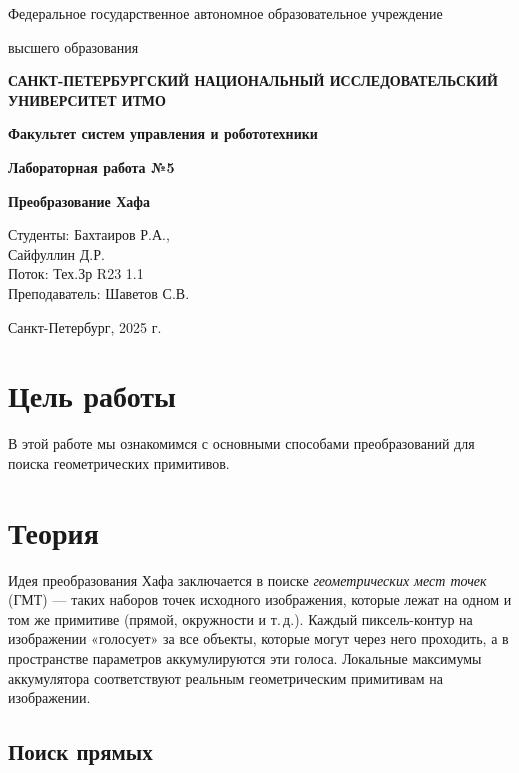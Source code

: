 \documentclass[a4paper,12pt]{article}
\begin{document}
    

\begin{titlepage}
    \centering
    {\large Федеральное государственное автономное образовательное учреждение\par}
    {\large высшего образования\par}
    {\bfseries САНКТ-ПЕТЕРБУРГСКИЙ НАЦИОНАЛЬНЫЙ ИССЛЕДОВАТЕЛЬСКИЙ УНИВЕРСИТЕТ ИТМО\par}
    {\bfseries Факультет систем управления и робототехники\par}
    \vfill
    {\Large \bfseries Лабораторная работа №5\par}
    {\Large \bfseries Преобразование Хафа\par}
    \vfill
    
    \begin{flushright}
        Студенты: Бахтаиров Р.А.,\\ 
        Сайфуллин Д.Р. \\
        Поток: Тех.Зр R23 1.1 \\
        Преподаватель: Шаветов С.В.
    \end{flushright}
    \vfill
    Санкт-Петербург, 2025 г.
\end{titlepage}

\tableofcontents
\newpage

\section{Цель работы}
В этой работе мы ознакомимся с основными способами преобразований для поиска геометрических примитивов.

\section{Теория}
Идея преобразования Хафа заключается в поиске \emph{геометрических мест точек} (ГМТ) — таких наборов точек исходного изображения, которые лежат на одном и том же примитиве (прямой, окружности и т.\,д.). Каждый пиксель­-контур на изображении «голосует» за все объекты, которые могут через него проходить, а в пространстве параметров аккумулируются эти голоса. Локальные максимумы аккумулятора соответствуют реальным геометрическим примитивам на изображении.

\subsection*{Поиск прямых}
\end{document}

